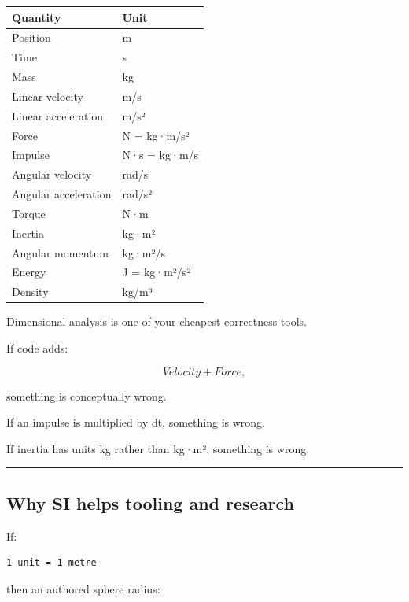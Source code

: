 {\def\LTcaptype{none} %
\begin{longtable}[]{@{}ll@{}}
\toprule\noalign{}
Quantity & Unit \\
\midrule\noalign{}
\endhead
\bottomrule\noalign{}
\endlastfoot
Position & m \\
Time & s \\
Mass & kg \\
Linear velocity & m/s \\
Linear acceleration & m/s² \\
Force & N = kg·m/s² \\
Impulse & N·s = kg·m/s \\
Angular velocity & rad/s \\
Angular acceleration & rad/s² \\
Torque & N·m \\
Inertia & kg·m² \\
Angular momentum & kg·m²/s \\
Energy & J = kg·m²/s² \\
Density & kg/m³ \\
\end{longtable}
}

Dimensional analysis is one of your cheapest correctness tools.

If code adds:

\[
Velocity+Force,
\]

something is conceptually wrong.

If an impulse is multiplied by dt, something is wrong.

If inertia has units kg rather than kg·m², something is wrong.

\begin{center}\rule{0.5\linewidth}{0.5pt}\end{center}

\subsection{Why SI helps tooling and research}\label{06-engine-ii-ch039-why-si-helps-tooling-and-research}

\hypertarget{06-engine-ii-ch039-why-si-helps-tooling-and-research}{}

If:

\begin{verbatim}
1 unit = 1 metre
\end{verbatim}

then an authored sphere radius:

